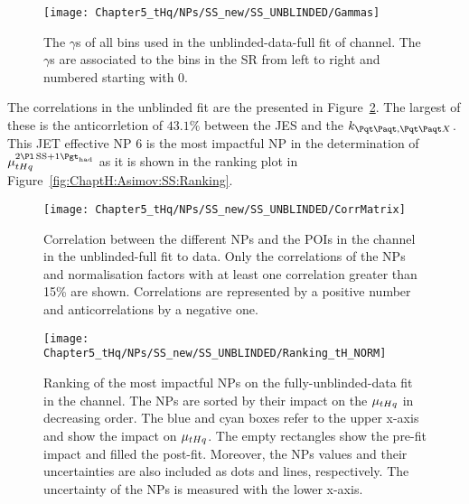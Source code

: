 \begin{figure}[h]
\centering
 \texttt{[image: Chapter5\_tHq/NPs/SS\_new/SS\_UNBLINDED/Gammas]}
\caption{The $\gamma$s of all bins used in the unblinded-data-full fit of \dilepSStau channel.
The $\gamma$s are associated to the bins in the SR from left to right
and numbered starting with 0.} 
\label{fig:ChaptH:fitToData:SS:Gammas}
\end{figure}

The correlations in the unblinded fit are the presented in Figure~\ref{fig:ChaptH:fitToData:SS:Correlation}.
The largest of these is the anticorrletion of $43.1\%$ between the JES and the $k_{\ttbar,\ttX}$.
This JET effective NP 6 is the most impactful NP in the determination of $\mu^{\dilepSStau}_{\tHq}$
as it is shown in the ranking plot in Figure~\ref{fig:ChaptH:Asimov:SS:Ranking}. 


\begin{figure}[h]
\centering
 \texttt{[image: Chapter5\_tHq/NPs/SS\_new/SS\_UNBLINDED/CorrMatrix]}
\caption{Correlation between the different NPs and the POIs in the \dilepSStau channel in the unblinded-full fit to data. 
Only the correlations of the NPs and normalisation factors with at least one correlation greater than 15\% are shown.
Correlations are represented by a positive number and anticorrelations by a negative one.} 
\label{fig:ChaptH:fitToData:SS:Correlation}
\end{figure}

\begin{figure}[h]%
    \centering
        \texttt{[image: Chapter5\_tHq/NPs/SS\_new/SS\_UNBLINDED/Ranking\_tH\_NORM]}
    \caption{Ranking of the most impactful NPs on the fully-unblinded-data fit in the \dilepSStau channel. 
    The NPs are sorted by their impact on the $\mu_{tHq}$ in decreasing order. 
    The blue and cyan boxes refer to the upper x-axis and show the impact on $\mu_{tHq}$.
    The empty rectangles show the pre-fit impact and filled the post-fit. 
    Moreover, the NPs values and their uncertainties are also included as dots and 
    lines, respectively. The uncertainty of the NPs is measured with the lower x-axis.}
    \label{fig:ChaptH:fitToData:SS:Ranking}
\end{figure}


